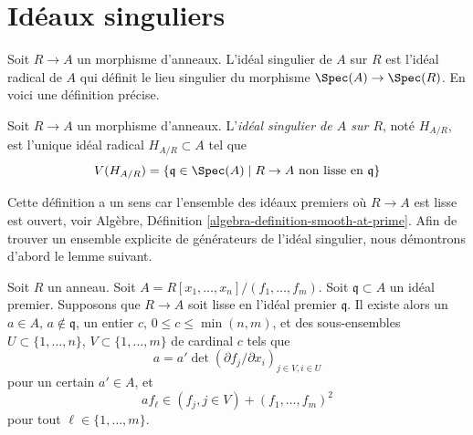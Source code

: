 \section{Idéaux singuliers}
\label{section-singular-ideal}

\noindent
Soit $R \to A$ un morphisme d'anneaux. L'idéal singulier de $A$ sur $R$ est
l'idéal radical de $A$ qui définit le lieu singulier du morphisme
$\Spec(A) \to \Spec(R)$. En voici une définition précise.

\begin{definition}
\label{definition-singular-ideal}
Soit $R \to A$ un morphisme d'anneaux. L'{\it idéal singulier de $A$ sur $R$},
noté $H_{A/R}$, est l'unique idéal radical $H_{A/R} \subset A$ tel que
$$
V(H_{A/R}) = \{\mathfrak q \in \Spec(A) \mid R \to A
\text{ non lisse en }\mathfrak q\}
$$
\end{definition}

\noindent
Cette définition a un sens car l'ensemble des idéaux premiers où $R \to A$
est lisse est ouvert, voir
Algèbre, Définition \ref{algebra-definition-smooth-at-prime}.
Afin de trouver un ensemble explicite de générateurs de l'idéal singulier,
nous démontrons d'abord le lemme suivant.

\begin{lemma}
\label{lemma-find-strictly-standard}
Soit $R$ un anneau. Soit $A = R[x_1, \ldots, x_n]/(f_1, \ldots, f_m)$.
Soit $\mathfrak q \subset A$ un idéal premier. Supposons que $R \to A$ soit
lisse en l'idéal premier $\mathfrak q$. Il existe alors un $a \in A$, $a \not \in \mathfrak q$,
un entier $c$, $0 \leq c \leq \min(n, m)$, et des sous-ensembles
$U \subset \{1, \ldots, n\}$, $V \subset \{1, \ldots, m\}$
de cardinal $c$ tels que
$$
a = a' \det(\partial f_j/\partial x_i)_{j \in V, i \in U}
$$
pour un certain $a' \in A$, et
$$
a f_\ell \in (f_j, j \in V) + (f_1, \ldots, f_m)^2
$$
pour tout $\ell \in \{1, \ldots, m\}$.
\end{lemma}

